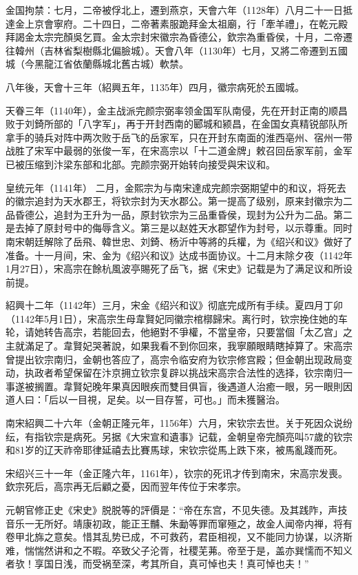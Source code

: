 金国拘禁：七月，二帝被俘北上，遷到燕京，天會六年（1128年）八月二十一日抵達金上京會寧府。二十四日，二帝著素服跪拜金太祖廟，行「牽羊禮」，在乾元殿拜謁金太宗完顏吳乞買。金太宗封宋徽宗為昏德公，欽宗為重昏侯，十月，二帝遷往韓州（吉林省梨樹縣北偏臉城）。天會八年（1130年）七月，又將二帝遷到五國城（今黑龍江省依蘭縣城北舊古城）軟禁。

八年後，天會十三年（紹興五年，1135年）四月，徽宗病死於五國城。

天眷三年（1140年），金主战派完颜宗弼率领金国军队南侵，先在开封正南的顺昌败于刘錡所部的「八字军」，再于开封西南的郾城和颍昌，在金国女真精锐部队所拿手的骑兵对阵中两次败于岳飞的岳家军，只在开封东南面的淮西亳州、宿州一带战胜了宋军中最弱的张俊一军，在宋高宗以「十二道金牌」敕召回岳家军前，金军已被压缩到汴梁东部和北部。完颜宗弼开始转向接受與宋议和。

皇统元年（1141年） 二月，金熙宗为与南宋達成完颜宗弼期望中的和议，将死去的徽宗追封为天水郡王，将钦宗封为天水郡公。第一提高了级别，原来封徽宗为二品昏德公，追封为王升为一品，原封钦宗为三品重昏侯，现封为公升为二品。第二是去掉了原封号中的侮辱含义。第三是以赵姓天水郡望作为封号，以示尊重。同时南宋朝廷解除了岳飛、韓世忠、刘錡、杨沂中等將的兵權，为《绍兴和议》做好了准备。十一月间，宋、金为《绍兴和议》达成书面协议。十二月末除夕夜（1142年1月27日），宋高宗在餘杭風波亭賜死了岳飞，据《宋史》记载是为了满足议和所设前提。

紹興十二年（1142年）三月，宋金《绍兴和议》彻底完成所有手续。夏四月丁卯（1142年5月1日），宋高宗生母韋賢妃同徽宗棺槨歸宋。离行时，钦宗挽住她的车轮，请她转告高宗，若能回去，他絕對不爭權，不當皇帝，只要當個「太乙宫」之主就滿足了。韋賢妃哭著說，如果我看不到你回來，我寧願眼睛瞎掉算了。宋高宗曾提出钦宗南归，金朝也答应了，高宗令临安府为钦宗修宫殿；但金朝出现政局变动，执政者希望保留在汴京拥立钦宗复辟以挑战宋高宗合法性的选择，钦宗南归一事遂被搁置。韋賢妃晚年果真因眼疾而雙目俱盲，後遇道人治癒一眼，另一眼則因道人曰：「后以一目視，足矣。以一目存誓，可也。」而未獲醫治。

南宋紹興二十六年（金朝正隆元年，1156年）六月，宋钦宗去世。关于死因众说纷纭，有指钦宗是病死。另据《大宋宣和遺事》记载，金朝皇帝完顏亮叫57歲的钦宗和81岁的辽天祚帝耶律延禧去比賽馬球，宋钦宗從馬上跌下來，被馬亂踐而死。

宋绍兴三十一年（金正隆六年，1161年），钦宗的死讯才传到南宋，宋高宗发喪。欽宗死后，高宗再无后顧之憂，因而翌年传位于宋孝宗。

元朝官修正史《宋史》脱脱等的評價是：“帝在东宫，不见失德。及其践阼，声技音乐一无所好。靖康初政，能正王黼、朱勔等罪而窜殛之，故金人闻帝内禅，将有卷甲北旆之意矣。惜其乱势已成，不可救药，君臣相视，又不能同力协谋，以济斯难，惴惴然讲和之不暇。卒致父子沦胥，社稷芜茀。帝至于是，盖亦巽懦而不知义者欤！享国日浅，而受祸至深，考其所自，真可悼也夫！真可悼也夫！”

